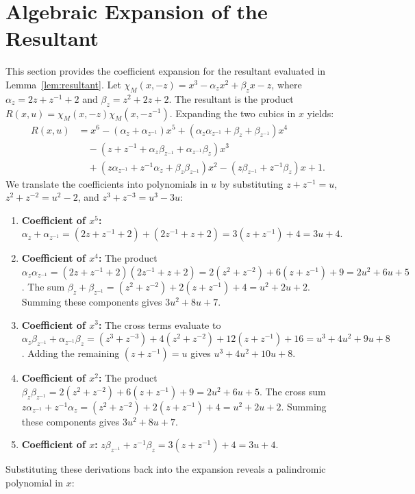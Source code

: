\documentclass[11pt]{article}
\begin{document}
\section{Algebraic Expansion of the Resultant}\label{app:resultant}

This section provides the coefficient expansion for the resultant evaluated in Lemma~\ref{lem:resultant}. Let $\chi_M(x, -z) = x^3 - \alpha_z x^2 + \beta_z x - z$, where $\alpha_z = 2z+z^{-1}+2$ and $\beta_z = z^2+2z+2$. The resultant is the product $R(x, u) = \chi_M(x, -z) \chi_M(x, -z^{-1})$. Expanding the two cubics in $x$ yields:
\begin{align*}
R(x,u) &= x^6 - (\alpha_z + \alpha_{z^{-1}})x^5 + (\alpha_z \alpha_{z^{-1}} + \beta_z + \beta_{z^{-1}})x^4 \\
&\quad - (z + z^{-1} + \alpha_z \beta_{z^{-1}} + \alpha_{z^{-1}} \beta_z)x^3 \\
&\quad + (z\alpha_{z^{-1}} + z^{-1}\alpha_z + \beta_z \beta_{z^{-1}})x^2 - (z\beta_{z^{-1}} + z^{-1}\beta_z)x + 1.
\end{align*}
We translate the coefficients into polynomials in $u$ by substituting $z+z^{-1}=u$, $z^2+z^{-2}=u^2-2$, and $z^3+z^{-3}=u^3-3u$:
\begin{enumerate}
    \item \textbf{Coefficient of $x^5$:} $\alpha_z + \alpha_{z^{-1}} = (2z+z^{-1}+2) + (2z^{-1}+z+2) = 3(z+z^{-1}) + 4 = 3u+4$.
    \item \textbf{Coefficient of $x^4$:} The product $\alpha_z \alpha_{z^{-1}} = (2z+z^{-1}+2)(2z^{-1}+z+2) = 2(z^2+z^{-2}) + 6(z+z^{-1}) + 9 = 2u^2+6u+5$. The sum $\beta_z + \beta_{z^{-1}} = (z^2+z^{-2}) + 2(z+z^{-1}) + 4 = u^2+2u+2$. Summing these components gives $3u^2+8u+7$.
    \item \textbf{Coefficient of $x^3$:} The cross terms evaluate to $\alpha_z \beta_{z^{-1}} + \alpha_{z^{-1}} \beta_z = (z^3+z^{-3}) + 4(z^2+z^{-2}) + 12(z+z^{-1}) + 16 = u^3+4u^2+9u+8$. Adding the remaining $(z+z^{-1}) = u$ gives $u^3+4u^2+10u+8$.
    \item \textbf{Coefficient of $x^2$:} The product $\beta_z \beta_{z^{-1}} = 2(z^2+z^{-2}) + 6(z+z^{-1}) + 9 = 2u^2+6u+5$. The cross sum $z\alpha_{z^{-1}} + z^{-1}\alpha_z = (z^2+z^{-2}) + 2(z+z^{-1}) + 4 = u^2+2u+2$. Summing these components gives $3u^2+8u+7$.
    \item \textbf{Coefficient of $x$:} $z\beta_{z^{-1}} + z^{-1}\beta_z = 3(z+z^{-1}) + 4 = 3u+4$.
\end{enumerate}
Substituting these derivations back into the expansion reveals a palindromic polynomial in $x$:
\end{document}
